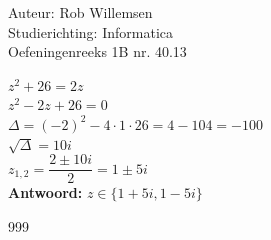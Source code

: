 \documentclass[a4paper]{article}
\begin{document}
\noindent \large Auteur: Rob Willemsen \\
\noindent \large Studierichting: Informatica\\
\noindent \large Oefeningenreeks 1B nr. 40.13\\

\medskip

\normalsize

$z^2 + 26 = 2z$ \\

$z^2 - 2z + 26 = 0$ \\

$\Delta = (-2)^2 - 4 \cdot 1 \cdot 26 = 4 - 104 = -100$ \\

$\sqrt{\Delta} = 10i$ \\

$z_{1,2} = \dfrac{2 \pm 10i}{2} = 1 \pm 5i$ \\

\textbf{Antwoord:} $z \in \{1+5i, 1-5i\}$

\begin{thebibliography}{999}
\end{thebibliography}
\end{document}
